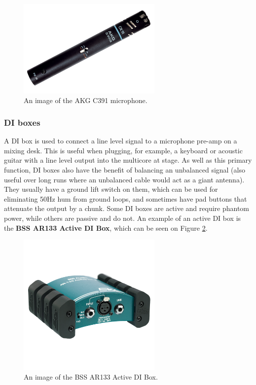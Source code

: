 \documentclass[14pt,twocolumn]{extarticle} %
\begin{document}
\begin{figure}[h]
\begin{center}

\includegraphics[width=7cm]{c391ba.jpg}
\caption{An image of the AKG C391 microphone.}
\label{fig:akgc391}

\end{center}
\end{figure}

\subsubsection{DI boxes}
\label{di-boxes}
A DI box is used to connect a line level signal to a microphone pre-amp on a mixing desk. This is useful when plugging, for example, a keyboard or acoustic guitar with a line level output into the multicore at stage. As well as this primary function, DI boxes also have the benefit of balancing an unbalanced signal (also useful over long runs where an unbalanced cable would act as a giant antenna). They usually have a ground lift switch on them, which can be used for eliminating 50Hz hum from ground loops, and
sometimes have pad buttons that attenuate the output by a chunk. Some DI boxes are active and require phantom power, while others are passive and do not. An example of an active DI box is the \textbf{BSS AR133 Active DI Box}, which can be seen on Figure \ref{fig:di-box}.

\begin{figure}[h]
\begin{center}

\includegraphics[width=7cm]{di-box.jpg}
\caption{An image of the BSS AR133 Active DI Box.}
\label{fig:di-box}

\end{center}
\end{figure}
\end{document}
